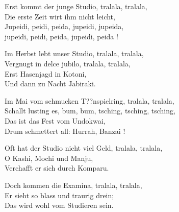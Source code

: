 \documentclass[10pt,b5j]{tarticle} %
\begin{document}
\vspace{1.5em} %
\newcommand{\linespace}{0.5em} %
\newcommand{\blocksize}{0.5\hsize} %
\begin{enumerate} %
    \begin{minipage}[c]{\blocksize}
    
        \vspace{\linespace}
        \item
        Erst kommt der junge Studio, tralala, tralala,\\
        Die erste Zeit wirt ihm nicht leicht,\\
        	Jupeidi, peidi, peida, jupeidi, jupeida,\\
        	jupeidi, peidi, peida, jupeidi, peida !
        
        \vspace{\linespace}
        \item
        Im Herbst lebt unser Studio, tralala, tralala,\\
        Vergnugt in delce jubilo, tralala, tralala,\\
        Erst Hasenjagd in Kotoni,\\
        Und dann zu Nacht Jabiraki.
        
        \vspace{\linespace}
        \item
        Im Mai vom schmucken T??nspielring, tralala, tralala,\\
        Schallt lusting es, bum, bum, tsching, tsching, tsching,\\
        Das ist das Fest vom Undokwai,\\
        Drum schmettert all: Hurrah, Banzai !
        
        \vspace{\linespace}
        \item
        Oft hat der Studio nicht viel Geld, tralala, tralala,\\
        O Kashi, Mochi und Manju,\\
        Verchafft er sich durch Komparu.
        
        \vspace{\linespace}
        \item
        Doch kommen die Examina, tralala, tralala,\\
        Er sieht so blass und traurig drein;\\
        Das wird wohl vom Studieren sein.
        

\end{minipage}
\end{enumerate}
\end{document}
